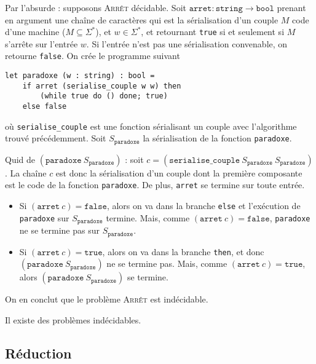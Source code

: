 \begin{prv}
	Par l'absurde : supposons \textsc{Arrêt} décidable.
	Soit $\texttt{arret} : \texttt{string} \to \texttt{bool}$\/ prenant en argument une chaîne de caractères qui est la sérialisation d'un couple $M$\/ code d'une machine ($M \subseteq \Sigma^*$), et $w \in \Sigma^*$, et retournant \texttt{true} si et seulement si $M$\/ s'arrête sur l'entrée $w$. Si l'entrée n'est pas une sérialisation convenable, on retourne \texttt{false}. On crée le programme suivant
	\begin{lstlisting}[language=caml,caption=Programme paradoxe prouvant que le problème \textsc{Arrêt} est indécidable]
let paradoxe (w : string) : bool =
	if arret (serialise_couple w w) then
		(while true do () done; true)
	else false
	\end{lstlisting}
	où \texttt{serialise\_couple} est une fonction sérialisant un couple avec l'algorithme trouvé précédemment. Soit $S_\texttt{paradoxe}$\/ la sérialisation de la fonction \texttt{paradoxe}.

	Quid de $(\texttt{paradoxe}\ S_{\texttt{paradoxe}})$ : soit $c = (\texttt{serialise\_couple}\ S_{\texttt{paradoxe}}\ S_{\texttt{paradoxe}})$. La chaîne $c$\/ est donc la sérialisation d'un couple dont la première composante est le code de la fonction \texttt{paradoxe}. De plus, \texttt{arret} se termine sur toute entrée.
	\begin{itemize}
		\item Si $(\texttt{arret}\ c) = \texttt{false}$, alors on va dans la branche \texttt{else} et l'exécution de \texttt{paradoxe} sur $S_{\texttt{paradoxe}}$ termine. Mais, comme $(\texttt{arret}\ c) = \texttt{false}$, \texttt{paradoxe} ne se termine pas sur $S_{\texttt{paradoxe}}$.
		\item Si $(\texttt{arret}\ c) = \texttt{true}$, alors on va dans la branche \texttt{then}, et donc $(\texttt{paradoxe}\ S_\texttt{paradoxe})$\/ ne se termine pas. Mais, comme $(\texttt{arret}\ c) = \texttt{true}$, alors $(\texttt{paradoxe}\ S_\texttt{paradoxe})$\/ se termine.
	\end{itemize}
	On en conclut que le problème \textsc{Arrêt} est indécidable.
\end{prv}

\begin{crlr}
	Il existe des problèmes indécidables.
\end{crlr}

\subsection{Réduction}

